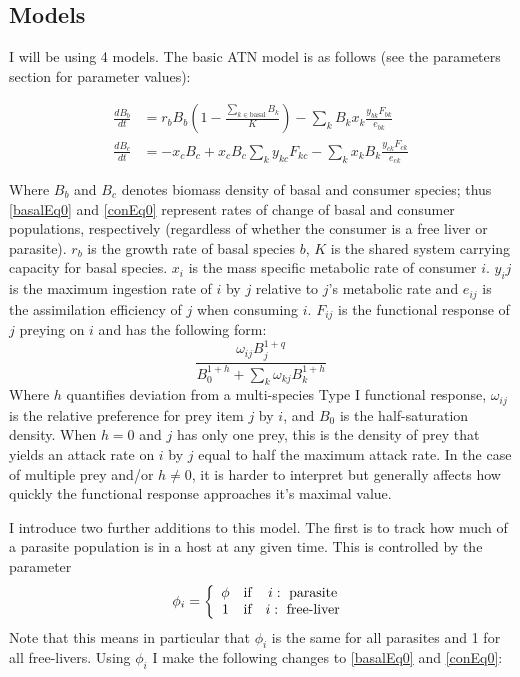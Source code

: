 \documentclass[11pt]{amsart}
\begin{document}
\subsection{Models}
I will be using 4 models.  The basic ATN model is as follows (see the parameters section for parameter values):

\begin{align}
\frac{dB_{b}}{dt} &= r_bB_b\left(1-\frac{\sum_{k\in\text{basal}}B_k}{K}\right) - \sum_kB_kx_k\frac{y_{bk}F_{bk}}{e_{bk}}\label{basalEq0} \\ 
\frac{dB_{c}}{dt} &= -x_cB_c + x_cB_c\sum_ky_{kc}F_{kc} - \sum_k x_kB_k\frac{y_{ck}F_{ck}}{e_{ck}} \label{conEq0}
\end{align}

Where $B_b$ and $B_c$ denotes biomass density of basal and consumer species; thus \eqref{basalEq0} and \eqref{conEq0} represent rates of change of basal and consumer populations, respectively (regardless of whether the consumer is a free liver or parasite).  $r_b$ is the growth rate of basal species $b$, $K$ is the shared system carrying capacity for basal species.  $x_i$ is the mass specific metabolic rate of consumer $i$. $y_ij$ is the maximum ingestion rate of $i$ by $j$ relative to $j$'s metabolic rate and $e_{ij}$ is the assimilation efficiency of $j$ when consuming $i$. $F_{ij}$ is the functional response of $j$ preying on $i$ and has the following form:
\begin{equation}
\frac{\omega_{ij}B_j^{1+q}}{B_0^{1+h} + \sum_k\omega_{kj}B_k^{1+h}}
\label{FR0}
\end{equation}
Where $h$ quantifies deviation from a multi-species Type I functional response, $\omega_{ij}$ is the relative preference for prey item $j$ by $i$, and $B_0$ is the half-saturation density.  When $h=0$ and $j$ has only one prey, this is the density of prey that yields an attack rate on $i$ by $j$ equal to half the maximum attack rate.  In the case of multiple prey and/or $h\neq0$, it is harder to interpret but generally affects how quickly the functional response approaches it's maximal value.  

I introduce two further additions to this model.  The first is to track how much of a parasite population is in a host at any given time.  This is controlled by the parameter
\begin{equation}
\phi_i = 
\left\{
\begin{array}{c c c}
\phi & \text{if} & i:\text{ parasite}\\
1 & \text{if} & i:\text{ free-liver}\\
\end{array}
\right.\label{phiDef}
\end{equation}
Note that this means in particular that $\phi_i$ is the same for all parasites and 1 for all free-livers.  Using $\phi_i$  I make the following changes to \eqref{basalEq0} and \eqref{conEq0}:
\end{document}
